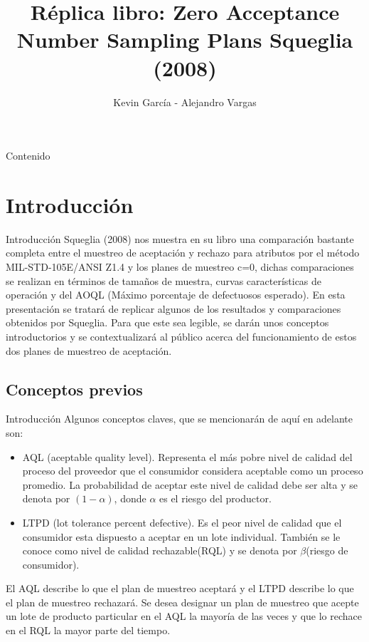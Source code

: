 \documentclass[10pt]{beamer}
\author{Kevin García - Alejandro Vargas}
\title{Réplica libro: Zero Acceptance Number Sampling Plans Squeglia (2008)}
\begin{document}
\begin{frame}[plain]
\maketitle
\end{frame}

\begin{frame}{Contenido}
\tableofcontents
\end{frame}

\section{Introducción}
\begin{frame}{Introducción}
Squeglia (2008)\cite{A0} nos muestra en su libro una comparación bastante completa entre el muestreo de aceptación y rechazo para atributos por el método MIL-STD-105E/ANSI Z1.4 y los planes de muestreo c=0, dichas comparaciones se realizan en términos de tamaños de muestra, curvas características de operación y del AOQL (Máximo porcentaje de defectuosos esperado). En esta presentación se tratará de replicar algunos de los resultados y comparaciones obtenidos por Squeglia. Para que este sea legible, se darán unos conceptos introductorios y se contextualizará al público acerca del funcionamiento de estos dos planes de muestreo de aceptación.
\end{frame}

\subsection{Conceptos previos}
\begin{frame}{Introducción}
Algunos conceptos claves, que se mencionarán de aquí en adelante son:
\begin{itemize}
\item AQL (aceptable quality level). Representa el más pobre nivel de calidad del proceso del proveedor que el consumidor considera aceptable como un proceso promedio. La probabilidad de aceptar este nivel de calidad debe ser alta y se denota por $(1-\alpha)$, donde $\alpha$ es el riesgo del productor.
\item LTPD (lot tolerance percent defective). Es el peor nivel de calidad que el consumidor esta dispuesto a aceptar en un lote individual. También se le conoce como nivel de calidad rechazable(RQL) y se denota por $\beta$(riesgo de consumidor).
\end{itemize}
El AQL describe lo que el plan de muestreo aceptará y el LTPD describe lo que el plan de muestreo rechazará. Se desea designar un plan de muestreo que acepte un lote de producto particular en el AQL la mayoría de las veces y que lo rechace en el RQL la mayor parte del tiempo.
\end{frame}
\end{document}
